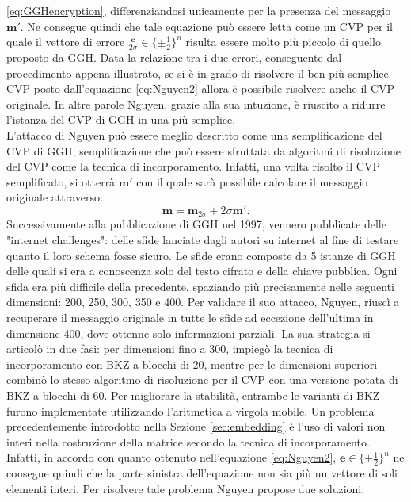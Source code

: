 \ref{eq:GGHencryption}, differenziandosi unicamente per la presenza del messaggio $\mathbf{m}'$.
Ne consegue quindi che tale equazione può essere letta come un CVP per il quale il vettore di 
errore $\frac{\mathbf{e}}{2\sigma} \in \{\pm\frac{1}{2}\}^n$ risulta essere molto più piccolo
di quello proposto da GGH. Data la relazione tra i due errori, conseguente dal procedimento appena
illustrato, se si è in grado di risolvere il ben più semplice CVP posto dall'equazione 
\ref{eq:Nguyen2} allora è possibile risolvere anche il CVP originale. In altre parole 
Nguyen, grazie alla sua intuzione, è riuscito a ridurre l'istanza del CVP di GGH in una più
semplice. \\
L'attacco di Nguyen può essere meglio descritto come una semplificazione del CVP di GGH, 
semplificazione che può essere sfruttata da algoritmi di risoluzione del CVP come la 
tecnica di incorporamento. Infatti, una volta risolto il CVP semplificato, si otterrà 
$\mathbf{m}'$ con il quale sarà possibile calcolare il messaggio originale attraverso: 
\[
    \mathbf{m} = \mathbf{m}_{2\sigma} + 2\sigma\mathbf{m}'.
\] 
Successivamente alla pubblicazione di GGH nel 1997, vennero
pubblicate delle "internet challenges": delle sfide lanciate dagli autori su internet
al fine di testare quanto il loro schema fosse sicuro. Le sfide erano composte da 5 istanze di GGH
delle quali si era a conoscenza solo del testo cifrato e della chiave pubblica. Ogni sfida 
era più difficile della precedente, spaziando più precisamente nelle seguenti dimensioni: 
200, 250, 300, 350 e 400. Per validare il suo attacco, Nguyen, riuscì a recuperare il messaggio 
originale in tutte le sfide ad eccezione dell'ultima in dimensione 400, dove ottenne solo informazioni 
parziali. La sua strategia si articolò in due fasi: per dimensioni fino a 300, impiegò la 
tecnica di incorporamento con BKZ a blocchi di 20, mentre per le dimensioni superiori combinò lo stesso 
algoritmo di risoluzione per il CVP con una versione potata di BKZ a blocchi di 60. Per migliorare la 
stabilità, entrambe le varianti di BKZ furono implementate utilizzando l'aritmetica a 
virgola mobile. Un problema precedentemente introdotto nella Sezione \ref{sec:embedding} 
è l'uso di valori non interi nella costruzione della matrice secondo la tecnica di incorporamento. 
Infatti, in accordo con quanto ottenuto nell'equazione \ref{eq:Nguyen2}, 
$\mathbf{e} \in \{\pm\frac{1}{2}\}^n$ ne consegue quindi che la parte sinistra dell'equazione
non sia più un vettore di soli elementi interi. Per risolvere tale problema Nguyen propose
due soluzioni:
